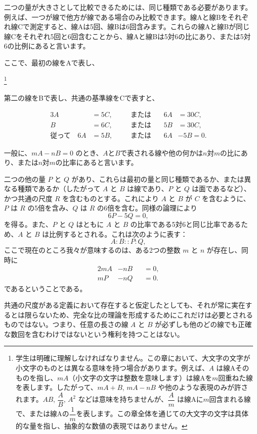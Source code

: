 \documentclass[a4paper,11pt,openany]{ltjsbook}
\begin{document}
二つの量が大きさとして比較できるためには、同じ種類である必要があります。例えば、一つが線で他方が線である場合のみ比較できます。線Aと線Bをそれぞれ線Cで測定すると、線Aは5回、線Bは6回含みます。これらの線Aと線Bが同じ線Cをそれぞれ5回と6回含むことから、線Aと線Bは5対6の比にあり、または5対6の比例にあると言います。

ここで、最初の線をAで表し、

\footnote{
学生は明確に理解しなければなりません。この章において、大文字の文字が小文字のものとは異なる意味を持つ場合があります。例えば、$A$ は線Aそのものを指し、$mA$（小文字の文字は整数を意味します）は線Aを$m$回重ねた線を表します。したがって、$mA + B$, $mA - nB$ や他のような表現のみが許されます。$AB$, $\dfrac{A}{B}$, $A^{2}$ などは意味を持ちませんが、$\dfrac{A}{m}$ は線Aに$m$回含まれる線で、または線Aの$\dfrac{1}{m}$を表します。この章全体を通じての大文字の文字は具体的な量を指し、抽象的な数値の表現ではありません。
}

第二の線をBで表し、共通の基準線をCで表すと、

\begin{alignat*}{3}
A &= 5C, \quad &&\text{または}\quad &6A &= 30C, \\
B &= 6C,       &&\text{または}      &5B &= 30C, \\
\text{従って}\quad
6A &= 5B,      &&\text{または}      &6A &- 5B = 0.
\end{alignat*}

一般に、$mA - nB = 0$ のとき、$A$と$B$で表される線や他の何かは$n$対$m$の比にあり、または$n$対$m$の比率にあると言います。


二つの他の量 $P$ と $Q$ があり、これらは最初の量と同じ種類であるか、または異なる種類であるか（したがって $A$ と $B$ は線であり、$P$ と $Q$ は面であるなど）、かつ共通の尺度 $R$ を含むものとする。これにより $A$ と $B$ が $C$ を含むように、$P$ は $R$ の5倍を含み、$Q$ は $R$ の6倍を含む。同様の論理により
\[
6P - 5Q = 0,
\]
を得る。また、$P$ と $Q$ はともに $A$ と $B$ の比率である5対6と同じ比率であるため、$A$ と $B$ は比例するとされる。これは次のように表す：
\[
A : B :: P : Q,
\]
ここで現在のところ我々が意味するのは、ある2つの整数 $m$ と $n$ が存在し、同時に
\begin{alignat*}{2}
mA &- nB &&= 0, \\
mP &- nQ &&= 0.
\end{alignat*}
であるということである。

共通の尺度がある定義において存在すると仮定したとしても、それが常に実在するとは限らないため、完全な比の理論を形成するためにこれだけは必要とされるものではない。つまり、任意の長さの線 $A$ と $B$ が必ずしも他のどの線でも正確な数回を含むわけではないという権利を持つことはない。
\end{document}
